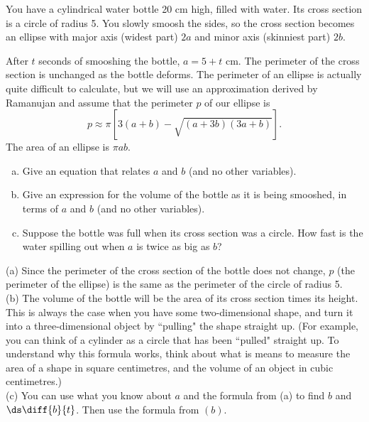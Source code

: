 \begin{question}
You have a cylindrical water bottle 20 cm high, filled with water. Its cross section is a circle of radius 5. You slowly smoosh the sides, so the cross section becomes an ellipse with major axis (widest part) $2a$ and minor axis (skinniest part) $2b$.

\begin{center}\end{center}

After $t$ seconds of smooshing the bottle, $a=5+t$ cm. The perimeter of the cross section is unchanged as the bottle deforms. The perimeter of an ellipse is actually quite difficult to calculate, but we will use an approximation derived by Ramanujan and assume that the perimeter $p$ of our ellipse is
\[p \approx \pi\left[3(a+b)-\sqrt{(a+3b)(3a+b)}\right].\]
The area of an ellipse is $\pi a b$.
\begin{enumerate}[(a)]
\item Give an equation that relates $a$ and $b$ (and no other variables).
\item Give an expression for the volume of the bottle as it is being smooshed, in terms of $a$ and $b$ (and no other variables).
\item Suppose the bottle was full when its cross section was a circle. How fast is the water spilling out when $a$ is twice as big as $b$?
\end{enumerate}
\end{question}
\begin{hint}
(a) Since the perimeter of the cross section of the bottle does not change, $p$ (the perimeter of the ellipse) is the same as the perimeter of the circle of radius 5.\\
(b) The volume of the bottle will be the area of its cross section times its height. This is always the case when you have some two-dimensional shape, and turn it into a three-dimensional object by ``pulling" the shape straight up. (For example, you can think of a cylinder as a circle that has been ``pulled" straight up. To understand why this formula works, think about what is means to measure the area of a shape in square centimetres, and the volume of an object in cubic centimetres.) \\
(c) You can use what you know about $a$ and the formula from (a) to find $b$ and $\ds\diff{b}{t}$. Then use the formula from $(b)$.
\end{hint}
